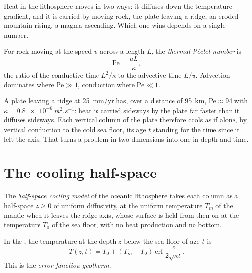 Heat in the lithosphere moves in two ways: it diffuses down the temperature
gradient, and it is carried by moving rock, the plate leaving a ridge, an
eroded mountain rising, a magma ascending. Which one wins depends on a single
number.

\begin{definition}\label{def:b3:lithosphere-thermal-models:peclet}
For rock moving at the speed $u$ across a length $L$, the \emph{thermal Péclet
number} is
\[
  \mathrm{Pe} = \frac{uL}{\kappa},
\]
the ratio of the conductive time $L^2/\kappa$ to the advective time $L/u$.
Advection dominates where $\mathrm{Pe} \gg 1$, conduction where
$\mathrm{Pe} \ll 1$.
\end{definition}

A plate leaving a ridge at \qty{25}{mm/yr} has, over a distance of
\qty{95}{km}, $\mathrm{Pe} \approx 94$ with $\kappa = \qty{0.8e-6}{m^2.s^{-1}}$:
heat is carried sideways by the plate far faster than it diffuses sideways.
Each vertical column of the plate therefore cools as if alone, by vertical
conduction to the cold sea floor, its age $t$ standing for the time since it
left the axis. That turns a problem in two dimensions into one in depth and
time.

\section{The cooling half-space}

\begin{definition}\label{def:b3:lithosphere-thermal-models:half-space}
The \emph{half-space cooling model} of the
oceanic lithosphere takes each column as a half-space $z \ge 0$ of uniform
diffusivity, at the uniform temperature $T_m$ of the mantle when it leaves the
ridge axis, whose surface is held from then on at the temperature $T_0$ of the
sea floor, with no heat production and no bottom.
\end{definition}

\begin{theorem}\label{thm:b3:lithosphere-thermal-models:erf}
In the , the temperature at the depth $z$ below the
sea floor of age $t$ is
\[
  T(z, t) = T_0 + (T_m - T_0)\operatorname{erf}\frac{z}{2\sqrt{\kappa t}} .
\]
This is the \emph{error-function geotherm}.
\end{theorem}

